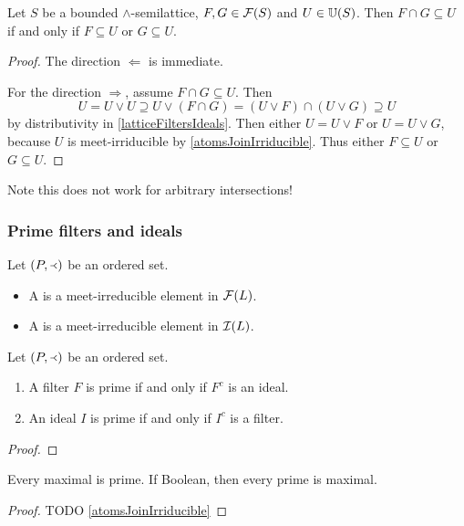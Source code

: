 \begin{lemma} \label{finiteUltrafilterFactorisation}
Let $S$ be a bounded $\wedge$-semilattice, $F, G\in \operatorname{\mathcal{F}}(S)$ and $U\in\operatorname{\mathbb{U}}(S)$. Then $F\cap G \subseteq U$ \textup{if and only if} $F\subseteq U$ or $G\subseteq U$.
\end{lemma}
\begin{proof}
The direction $\Leftarrow$ is immediate.

For the direction $\Rightarrow$, assume $F\cap G \subseteq U$. Then
\[ U = U\vee U \supseteq U\vee (F\cap G) = (U\vee F)\cap (U\vee G) \supseteq U \]
by distributivity in \ref{latticeFiltersIdeals}. Then either $U = U\vee F$ or $U = U\vee G$, because $U$ is meet-irriducible by \ref{atomsJoinIrriducible}. Thus either $F\subseteq U$ or $G\subseteq U$.
\end{proof}
Note this does not work for arbitrary intersections!

\subsubsection{Prime filters and ideals}
\begin{definition}
Let $\left( P,\Yleft \right)$ be an ordered set.
\begin{itemize}
\item A  is a meet-irreducible element in $\operatorname{\mathcal{F}}(L)$.
\item A  is a meet-irreducible element in $\operatorname{\mathcal{I}}(L)$.
\end{itemize}
\end{definition}

\begin{proposition}
Let $\left( P,\Yleft \right)$ be an ordered set.
\begin{enumerate}
\item A filter $F$ is prime \textup{if and only if} $F^c$ is an ideal.
\item An ideal $I$ is prime \textup{if and only if} $I^c$ is a filter.
\end{enumerate}
\end{proposition}
\begin{proof}

\end{proof}

\begin{lemma} \label{maximalPrimeFiltersIdeals}
Every maximal is prime. If Boolean, then every prime is maximal.
\end{lemma}
\begin{proof}
TODO \ref{atomsJoinIrriducible}
\end{proof}


